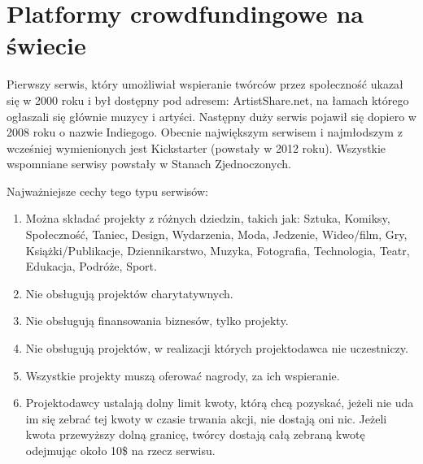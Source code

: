 \documentclass[12pt, a4paper]{article}
\begin{document}
\section{Platformy crowdfundingowe na świecie}
\label{sec:platf}

 Pierwszy serwis, który umożliwiał wspieranie twórców przez społeczność ukazał się w 2000 roku i był dostępny pod adresem: ArtistShare.net, na łamach którego ogłaszali się głównie muzycy i artyści. Następny duży serwis pojawił się dopiero w 2008 roku o nazwie Indiegogo. Obecnie największym serwisem i najmłodszym z wcześniej wymienionych jest Kickstarter (powstały w 2012 roku). Wszystkie wspomniane serwisy powstały w Stanach Zjednoczonych.

Najważniejsze cechy tego typu serwisów:
\begin{enumerate}
\item Można składać projekty z różnych dziedzin, takich jak: Sztuka, Komiksy, Społeczność, Taniec, Design, Wydarzenia, Moda, Jedzenie, Wideo/film, Gry, Książki/Publikacje, Dziennikarstwo, Muzyka, Fotografia, Technologia, Teatr, Edukacja, Podróże, Sport.
\item Nie obsługują projektów charytatywnych.
\item Nie obsługują finansowania biznesów, tylko projekty.
\item Nie obsługują projektów, w realizacji których projektodawca nie uczestniczy.
\item Wszystkie projekty muszą oferować nagrody, za ich wspieranie.
\item Projektodawcy ustalają dolny limit kwoty, którą chcą pozyskać, jeżeli nie uda im się zebrać tej kwoty w czasie trwania akcji, nie dostają oni nic. Jeżeli kwota przewyższy dolną granicę, twórcy dostają całą zebraną kwotę odejmując około 10\$ na rzecz serwisu.
\end{enumerate}
\end{document}
